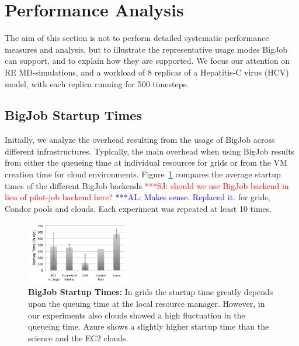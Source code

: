 \documentclass[conference,final]{IEEEtran}
\newcommand{\up}{\vspace*{-1em}}
\newcommand{\numrep}{8 }
\newcommand{\alnote}[1]{ {\textcolor{blue} { ***AL: #1 }}}
\newcommand{\jhanote}[1]{ {\textcolor{red} { ***SJ: #1 }}}
\newcommand{\alnote}[1]{}
\newcommand{\jhanote}[1]{}
\begin{document}


\up
\section{Performance Analysis}
\label{sec:performance}
\up The aim of this section is not to perform detailed systematic
performance measures and analysis, but to illustrate the
representative usage modes BigJob can support, and to explain how they
are supported.  %
We focus our attention on RE MD-simulations, and a workload of \numrep
replicas of a Hepatitis-C virus (HCV) model, with each replica running
for 500 timesteps.  \up

\subsection{BigJob Startup Times}
\up Initially, we analyze the overhead resulting from the usage of
BigJob across different infrastructures. Typically, the main overhead
when using BigJob results from either the queueing time at individual
resources for grids or from the VM creation time for cloud
environments.  Figure~\ref{fig:performance_setup_time} compares the
average startup times of the different BigJob backends
\jhanote{should we use BigJob backend in lieu of pilot-job backend
  here?} \alnote{Makes sense. Replaced it.} for grids, Condor pools and clouds. Each experiment was
repeated at least 10 times.

\begin{figure}[htbp]
    \centering
        \includegraphics[width=0.4\textwidth]{performance/setup-times}
    \caption{\textbf{BigJob Startup Times:} In grids the startup time
      greatly depends upon the queuing time at the local resource
      manager. However, in our experiments also clouds showed a high
      fluctuation in the queueing time. Azure shows a slightly higher
      startup time than the science and the EC2 clouds.\up}
    \label{fig:performance_setup_time}
\end{figure}
\end{document}
